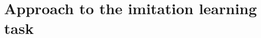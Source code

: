 \documentclass[letterpaper]{article} %
\theoremstyle{definition}%
\theoremstyle{definition}
\newtheorem{example}{Example}
\newcommand{\dob}[1]{do(#1)}
\newcommand{\Obs}{Y}
\newcommand{\obs}{y}
\newcommand{\Out}{Z}
\newcommand{\todo}[1]{\textcolor{red}{#1}}
\begin{document}

\section{Approach to the imitation learning task }
\label{sec:imitask}

%
\end{document}
